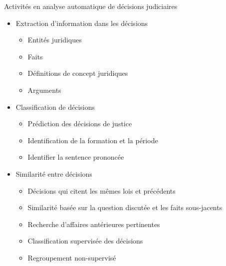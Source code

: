 \begin{frame}[t]{\mysubsectiontitle}
	Activités en analyse automatique de décisions judiciaires	
	\begin{itemize}\scriptsize
		\item Extraction d'information dans les décisions
		\begin{itemize}  \scriptsize
			\item Entités juridiques \cite{Waltl2016lexia, andrew2018legalNerAndRelation}
			\item Faits \cite{wyner2010extractlegalelts, wyner2010casefactors, Shulayeva2017recognfactprincip}
			\item Définitions de concept juridiques \cite{Waltl2016lexia,waltl2017legaliegerman}
			\item Arguments \cite{moens2007NBvsMaxent4arguments}
		\end{itemize}
		\item Classification de décisions
		\begin{itemize} \scriptsize
			\item Prédiction des décisions de justice \cite{Ashley2009classifCases, Aletras2016predictDecisionECHR}
			\item Identification de la formation et la période \cite{Sulea2017predictareadecision,sulea2017legalEnsSVM}
			\item Identifier la sentence prononcée \cite{ma2018wmdchinesecase}
		\end{itemize}
		\item Similarité entre décisions 
		\begin{itemize}  \scriptsize
			\item Décisions qui citent les mêmes lois et précédents \cite{nair2018judgsimassorule}
			\item Similarité basée sur la question discutée et les faits sous-jacents  \cite{kumar2011judgmentsimilarity}
			\item Recherche d'affaires antérieures pertinentes  \cite{thenmozhi2017legalprecedretriev}
			\item Classification supervisée des décisions \cite{ma2018wmdchinesecase}
			\item Regroupement non-supervisé \cite{raghuveer2012legalclusteringLDA}
		\end{itemize}
	\end{itemize}
\end{frame}

